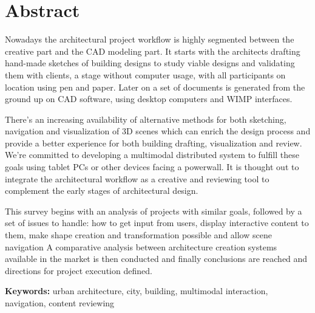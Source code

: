 \chapter*{Abstract}


Nowadays the architectural project workflow is highly segmented
between the creative part and the CAD modeling part.
It starts with the architects drafting hand-made sketches of building designs
to study viable designs and validating them with clients, a stage without computer usage, 
with all participants on location using pen and paper.
Later on a set of documents is generated from the ground up on CAD software, 
using desktop computers and WIMP interfaces.

There's an increasing availability of alternative methods for both sketching, navigation and visualization
of 3D scenes which can enrich the design process and provide a better experience for both
building drafting, visualization and review.
We're committed to developing a multimodal distributed system to fulfill these goals
using tablet PCs or other devices facing a powerwall.
It is thought out to integrate the architectural workflow as a creative and reviewing tool
to complement the early stages of architectural design.

This survey begins with an analysis of projects with similar goals,
followed by a set of issues to handle:
how to get input from users,
display interactive content to them,
make shape creation and transformation possible and
allow scene navigation
A comparative analysis between architecture creation systems available in the market is then conducted and
finally conclusions are reached and directions for project execution defined.

\textbf{Keywords:} urban architecture, city, building, multimodal interaction, navigation, content reviewing
